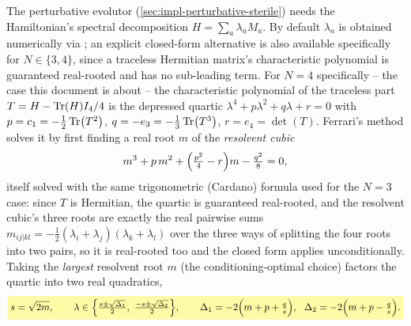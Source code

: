 
\begin{theorybox}
The perturbative evolutor (\cref{sec:impl-perturbative-sterile}) needs the
Hamiltonian's spectral decomposition $H=\sum_a\lambda_a M_a$. By default
$\lambda_a$ is obtained numerically via ; an
explicit closed-form alternative is also available specifically for
$N\in\{3,4\}$, since a traceless Hermitian matrix's characteristic
polynomial is guaranteed real-rooted and has no sub-leading term. For
$N=4$ specifically -- the case this document is about -- the characteristic
polynomial of the traceless part $T=H-\Tr(H)I_4/4$ is the depressed
quartic $\lambda^4+p\lambda^2+q\lambda+r=0$ with $p=c_1=-\tfrac12\Tr(T^2)$,
$q=-e_3=-\tfrac13\Tr(T^3)$, $r=e_4=\det(T)$. Ferrari's method solves it by
first finding a real root $m$ of the \emph{resolvent cubic}
\begin{equation}
  m^3+p\,m^2+\Bigl(\tfrac{p^2}4-r\Bigr)m-\tfrac{q^2}8=0,
\end{equation}
itself solved with the same trigonometric (Cardano) formula used for the
$N=3$ case: since $T$ is Hermitian, the quartic is guaranteed real-rooted,
and the resolvent cubic's three roots are exactly the real pairwise sums
$m_{ij|kl}=-\tfrac12(\lambda_i+\lambda_j)(\lambda_k+\lambda_l)$ over the
three ways of splitting the four roots into two pairs, so it is real-rooted
too and the closed form applies unconditionally. Taking the \emph{largest}
resolvent root $m$ (the conditioning-optimal choice) factors the quartic
into two real quadratics,
\begin{equation}
  \keyresult{
    s=\sqrt{2m},\qquad
    \lambda\in\Bigl\{\tfrac{s\pm\sqrt{\Delta_1}}2,\ \tfrac{-s\pm\sqrt{\Delta_2}}2\Bigr\},
    \qquad
    \Delta_1=-2\Bigl(m+p+\tfrac qs\Bigr),\ \ \Delta_2=-2\Bigl(m+p-\tfrac qs\Bigr).
  }
\end{equation}
\end{theorybox}

